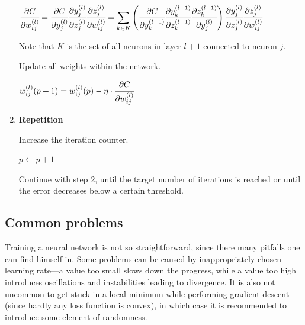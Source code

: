 \begin{algorithm}[H]
\begin{enumerate}
     $ \cfrac{\partial C}{\partial w_{ij}^{(l)}} = \cfrac{\partial C}{\partial y_j^{(l)}}
       \cfrac{\partial y_j^{(l)}}{\partial z_j^{(l)}}
       \cfrac{\partial z_j^{(l)}}{\partial w_{ij}^{(l)}} =
       \displaystyle{\sum_{k \in K}} \left( \cfrac{\partial C}{\partial y_k^{(l+1)}}
       \cfrac{\partial y_k^{(l+1)}}{\partial z_k^{(l+1)}}
       \cfrac{\partial z_k^{(l+1)}}{\partial y_j^{(l)}} \right)
       \cfrac{\partial y_j^{(l)}}{\partial z_j^{(l)}}
       \cfrac{\partial z_j^{(l)}}{\partial w_{ij}^{(l)}} $
       
    Note that $K$ is the set of all neurons in layer $l+1$ connected to neuron $j$.
    
    Update all weights within the network.
     
     $ w_{ij}^{(l)}(p+1) = w_{ij}^{(l)}(p) - \eta \cdot \cfrac{\partial C}{\partial w_{ij}^{(l)}} $
     
     \item \textbf{Repetition}
     
     Increase the iteration counter.
     
     $ p \leftarrow p + 1 $
     
     Continue with step 2, until the target number of iterations is reached or
     until the error decreases below a certain threshold.
     
\end{enumerate}
\end{algorithm}


\subsection*{Common problems}
\label{common-problems}
Training a neural network is not so straightforward, since there many pitfalls
one can find himself in.
Some problems can be caused by inappropriately chosen learning rate---a value too small
slows down the progress, while a value too high introduces oscillations and instabilities
leading to divergence. It is also not uncommon to get stuck
in a local minimum while performing gradient descent (since hardly any loss function
is convex), in which case it is recommended to introduce some element of randomness.

